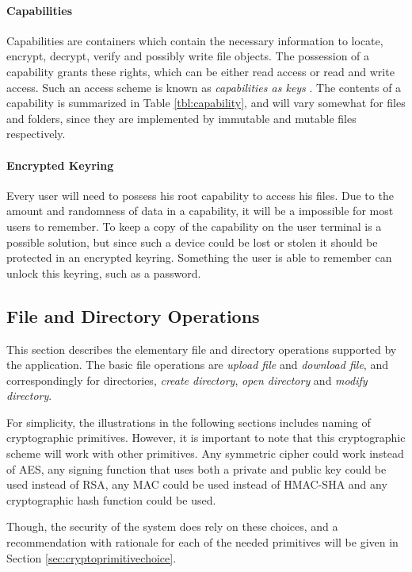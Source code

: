 \documentclass[pdftex,english,10pt,b5paper,twoside]{book}
\begin{document}
\paragraph{Capabilities} Capabilities are containers which contain the
necessary information to locate, encrypt, decrypt, verify and possibly write
file objects. The possession of a capability grants these rights, which can be
either read access or read and write access. Such an access scheme is known as
\emph{capabilities as keys} \cite{capabilitymyths}. The contents of a
capability is summarized in Table \ref{tbl:capability}, and will vary somewhat
for files and folders, since they are implemented by immutable and mutable
files respectively.



\paragraph{Encrypted Keyring} Every user will need to possess his root
capability to access his files. Due to the amount and randomness of data in a
capability, it will be a impossible for most users to remember. To keep a copy
of the capability on the user terminal is a possible solution, but since such a
device could be lost or stolen it should be protected in an encrypted keyring.
Something the user is able to remember can unlock this keyring, such as a
password.


\subsection{File and Directory Operations}
\label{sec:CS:DO}

This section describes the elementary file and directory operations supported
by the application. The basic file operations are \emph{upload file} and
\emph{download file}, and correspondingly for directories, \emph{create
directory}, \emph{open directory} and \emph{modify directory}.

For simplicity, the illustrations in the following sections includes naming of
cryptographic primitives. However, it is important to note that this
cryptographic scheme will work with other primitives. Any symmetric cipher
could work instead of \ac{AES}, any signing function that uses both a private
and public key could be used instead of \ac{RSA}, any \ac{MAC} could be used
instead of HMAC-\ac{SHA} and any cryptographic hash function could be used.

Though, the security of the system does rely on these choices, and a
recommendation with rationale for each of the needed primitives will be given
in Section \ref{sec:cryptoprimitivechoice}.
\end{document}
